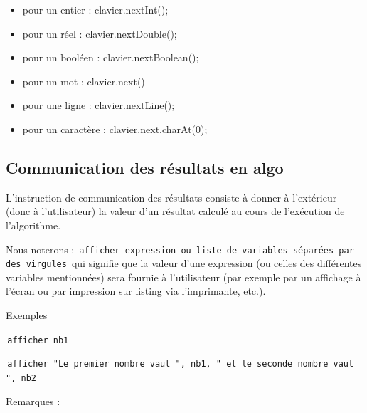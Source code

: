 \documentclass[11pt,a4paper]{article}
\begin{document}
					\begin{itemize}
				
			\item pour un entier : clavier.nextInt();
			\item pour un r\'eel : clavier.nextDouble();
			\item pour un bool\'een : clavier.nextBoolean();
			\item pour un mot : clavier.next()
			\item pour une ligne : clavier.nextLine();
			\item pour un caract\`ere : clavier.next.charAt(0);
					\end{itemize}
				
            \par
        \subsection{Communication des r\'esultats en algo}
          L'instruction de communication des r\'esultats consiste \`a donner \`a l'ext\'erieur (donc \`a l'utilisateur) 
          la valeur d'un r\'esultat calcul\'e au cours de l'ex\'ecution de l'algorithme.
        
            \par
        
          Nous noterons :
          \,\verb|afficher expression ou liste de variables séparées par des virgules|\,
          qui signifie que la valeur d'une expression (ou celles des diff\'erentes variables mentionn\'ees) 
          sera fournie \`a l'utilisateur (par exemple par un affichage \`a l'\'ecran ou par impression sur
          listing via l'imprimante, etc.).
          
            \par
        
          Exemples \par
				\par
				\,\verb|afficher nb1|\,\par
				\par
				\,\verb|afficher "Le premier nombre vaut ", nb1, " et le seconde nombre vaut ", nb2 |\,
            \par
        
          Remarques :
          
\end{document}
